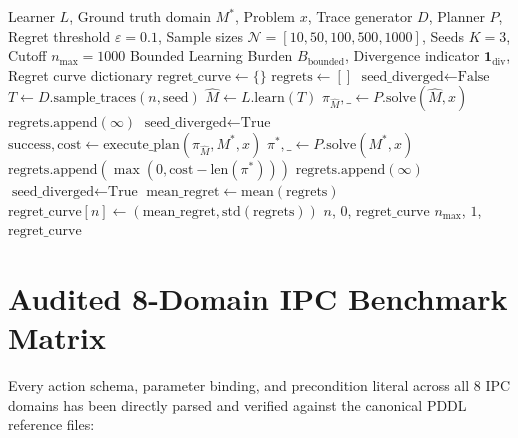\documentclass[11pt,a4paper]{article}
\theoremstyle{definition}
\begin{document}
\begin{algorithm}[h!]
\caption{Measurement of Bounded Learning Burden $B_{\text{bounded}}$}
\begin{algorithmic}[1]
\Require Learner $L$, Ground truth domain $M^*$, Problem $x$, Trace generator $D$, Planner $P$, Regret threshold $\varepsilon = 0.1$, Sample sizes $\mathcal{N} = [10, 50, 100, 500, 1000]$, Seeds $K = 3$, Cutoff $n_{\max} = 1000$
\Ensure Bounded Learning Burden $B_{\text{bounded}}$, Divergence indicator $\mathbf{1}_{\text{div}}$, Regret curve dictionary
\State $\text{regret\_curve} \gets \{\}$
    \State $\text{regrets} \gets []$
    \State $\text{seed\_diverged} \gets \text{False}$
        \State $T \gets D.\text{sample\_traces}(n, \text{seed})$
        \State $\widehat{M} \gets L.\text{learn}(T)$
        \State $\pi_{\widehat{M}}, \_ \gets P.\text{solve}(\widehat{M}, x)$
            \State $\text{regrets}.\text{append}(\infty)$
            \State $\text{seed\_diverged} \gets \text{True}$
        \Else
            \State $\text{success}, \text{cost} \gets \text{execute\_plan}(\pi_{\widehat{M}}, M^*, x)$
                \State $\pi^*, \_ \gets P.\text{solve}(M^*, x)$
                \State $\text{regrets}.\text{append}(\max(0, \text{cost} - \text{len}(\pi^*)))$
            \Else
                \State $\text{regrets}.\text{append}(\infty)$
                \State $\text{seed\_diverged} \gets \text{True}$
            \EndIf
        \EndIf
    \EndFor
    \State $\text{mean\_regret} \gets \text{mean}(\text{regrets})$
    \State $\text{regret\_curve}[n] \gets (\text{mean\_regret}, \text{std}(\text{regrets}))$
        \State \Return $n$, $0$, $\text{regret\_curve}$ 
    \EndIf
\EndFor
\State \Return $n_{\max}$, $1$, $\text{regret\_curve}$ 
\end{algorithmic}
\end{algorithm}

\section{Audited 8-Domain IPC Benchmark Matrix}

Every action schema, parameter binding, and precondition literal across all 8 IPC domains has been directly parsed and verified against the canonical PDDL reference files:
\end{document}
